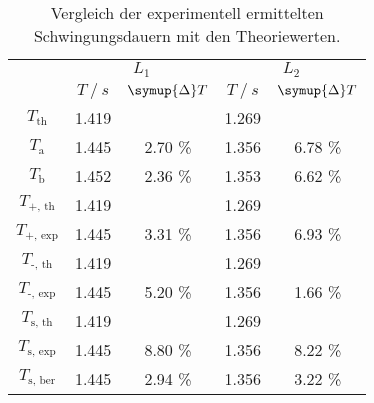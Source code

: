 \begin{table}
	\centering
	\caption{Vergleich der experimentell ermittelten Schwingungsdauern mit den Theoriewerten.}
	\label{tab:diskussion}
	\begin{tabular}{ S | S S | S S  }
		\toprule
		{ } &  &  \\
		\cmidrule(lr){2-3}\cmidrule(lr){4-5}
		{ } & {$ T \:/\: \si{s}$} & {$ \symup{\Delta} T $} & {$ T\:/\: \si{s}$} & {$ \symup{\Delta} T $}  \\
		\midrule
		$T_\text{th}$ & 1.419  &  & 1.269  &  \\
		$T_\text{a}$  & 1.445  & 2.70 \% & 1.356  & 6.78 \% \\
		$T_\text{b}$  & 1.452  & 2.36 \% & 1.353  & 6.62 \% \\
		\midrule
		$T_\text{+, th}$ & 1.419  &  & 1.269  &  \\
		$T_\text{+, exp}$  & 1.445  & 3.31 \% & 1.356  & 6.93 \% \\
		\midrule
		$T_\text{-, th}$ & 1.419  &  & 1.269  &  \\
		$T_\text{-, exp}$  & 1.445  & 5.20 \% & 1.356  & 1.66 \% \\
		\midrule
		$T_\text{s, th}$ & 1.419  &  & 1.269  &  \\
		$T_\text{s, exp}$  & 1.445  & 8.80 \% & 1.356  & 8.22 \% \\
		$T_\text{s, ber}$  & 1.445  & 2.94 \% & 1.356  & 3.22 \% \\
		\bottomrule
	\end{tabular}
\end{table}